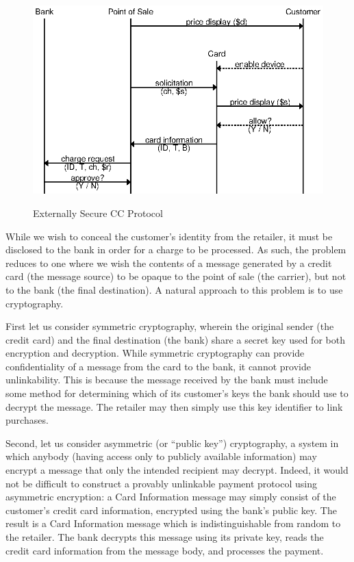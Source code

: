 \begin{figure}[h!]
  \caption{Externally Secure CC Protocol}
  \centering
    \includegraphics{img/secure_ccp.eps}
  \label{fig:external_ccp_recall}
\end{figure}


While we wish to conceal the customer's identity from the retailer, it must be disclosed to the bank in order for a charge to be processed.
As such, the problem reduces to one where we wish the contents of a message generated by a credit card (the message source)
  to be opaque to the point of sale (the carrier), but not to the bank (the final destination).
A natural approach to this problem is to use cryptography.

First let us consider symmetric cryptography, wherein the original sender (the credit card) and the final destination (the bank) share a secret key used for both encryption and decryption.
While symmetric cryptography can provide confidentiality of a message from the card to the bank, it cannot provide unlinkability.
This is because the message received by the bank must include some method for determining which of its customer's keys the bank should use to decrypt the message.
The retailer may then simply use this key identifier to link purchases.

Second, let us consider asymmetric (or ``public key'') cryptography,
  a system in which anybody (having access only to publicly available information) may encrypt a message that only the intended recipient may decrypt.
Indeed, it would not be difficult to construct a provably unlinkable payment protocol using asymmetric encryption:
a Card Information message may simply consist of the customer's credit card information, encrypted using the bank's public key.
The result is a Card Information message which is indistinguishable from random to the retailer.
The bank decrypts this message using its private key, reads the credit card information from the message body, and processes the payment.


